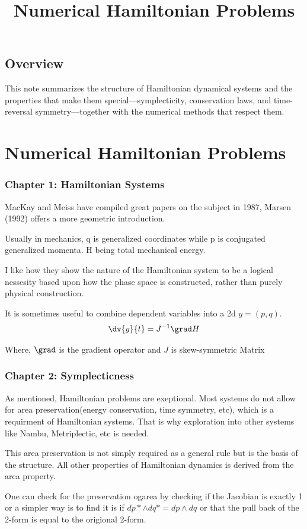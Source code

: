 \title{Numerical Hamiltonian Problems}

\section{Overview}
This note summarizes the structure of Hamiltonian dynamical systems and the properties that make them special---symplecticity, conservation laws, and time-reversal symmetry---together with the numerical methods that respect them.

\chapter{Numerical Hamiltonian Problems}
\subsection{Chapter 1: Hamiltonian Systems}

MacKay and Meiss have compiled great papers on the subject in 1987, Marsen (1992) offers a more geometric introduction.

Usually in mechanics, q is generalized coordinates while p is conjugated generalized momenta. H being total mechanical energy.

I like how they show the nature of the Hamiltonian system to be a logical nessesity based upon how the phase space is constructed, rather than purely physical construction.

It is sometimes useful to combine dependent variables into a 2d $ y = (p,q) $.
$$ \dv{y}{t} =J^{-1} \grad H $$

Where, $\grad $ is the gradient operator and $J$ is skew-symmetric Matrix


\subsection{Chapter 2: Symplecticness}

As mentioned, Hamiltonian problems are exeptional. Most systems do not allow for area preservation(energy conservation, time symmetry, etc), which is a requirment of Hamiltonian systems.
That is why exploration into other systems like Nambu, Metriplectic, etc is needed.

This area preservation is not simply required as a general rule but is the basis of the structure. All other properties of Hamiltonian dynamics is derived from the area property.

One can check for the preservation ogarea by checking if the Jacobian is exactly 1 or a simpler way is to find it is if $ dp* \wedge dq* = dp \wedge dq $ or that the pull back of the 2-form is equal to the origional 2-form.

